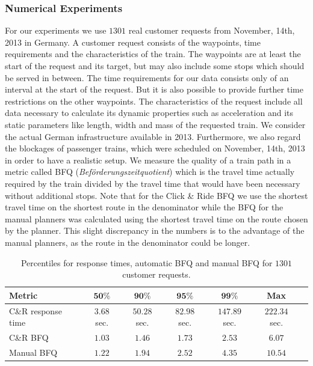 \subsubsection{Numerical Experiments}
For our experiments we use $1301$ real customer requests from November, 14th, 2013 in Germany. A customer request consists of the waypoints, time requirements and the characteristics of the train. The waypoints are at least the start of the request and its target, but may also include some stops which should be served in between. The time requirements for our data consists only of an interval at the start of the request. But it is also possible to provide further time restrictions on the other waypoints. The characteristics of the request include all data necessary to calculate its dynamic properties such as acceleration and its static parameters like length, width and mass of the requested train. We consider the actual German infrastructure available in 2013. Furthermore, we also regard the blockages of passenger trains, which were scheduled on November, 14th, 2013 in order to have a realistic setup. We measure the quality of a train path in a metric called BFQ (\textit{Beförderungszeitquotient}) which is the travel time actually required by the train divided by the travel time that would have been necessary without additional stops. Note that for the Click \& Ride BFQ we use the shortest travel time on the shortest route in the denominator while the BFQ for the manual planners was calculated using the shortest travel time on the route chosen by the planner. This slight discrepancy in the numbers is to the advantage of the manual planners, as the route in the denominator could be longer.
%
\begin{table}[h]
	\centering
	\caption{Percentiles for response times, automatic BFQ and manual BFQ for $1301$ customer requests.}
	\label{tab:result_CnR}
	\begin{tabular}{lcccccc} \hline
	 	\textbf{Metric}    & $\textbf{50\%}$ & $\textbf{90\%}$ & $\textbf{95\%}$ & $\textbf{99\%}$ & \textbf{Max}  \\ \hline
		C\&R response time & $3.68$ sec.     & $50.28$ sec.    & $82.98$ sec.    & $147.89$ sec.   & $222.34$ sec. \\
		C\&R BFQ           & $1.03$          & $1.46$          & $1.73$          & $2.53$          & $6.07$ \\
		Manual BFQ         & $1.22$          & $1.94$          & $2.52$          & $4.35$          & $10.54$ \\ \hline
	\end{tabular}
\end{table}
\par

